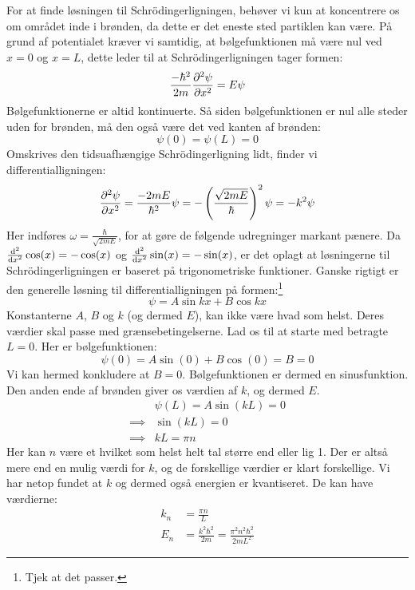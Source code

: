 \documentclass[../Kvantemekanik.tex]{subfiles}
\begin{document}
For at finde løsningen til Schrödingerligningen, behøver vi kun at koncentrere os om området inde i brønden, da dette er det eneste sted partiklen kan være. På grund af potentialet kræver vi samtidig, at bølgefunktionen må være nul ved $x=0$ og $x=L$, dette leder til at Schrödingerligningen tager formen:
\begin{equation}
    \frac{-\hbar^2}{2m}\pdif[2]{x}\psi=E\psi
    \label{kvant:eq:infb}
\end{equation}
Bølgefunktionerne er altid kontinuerte. Så siden bølgefunktionen er nul alle steder uden for brønden, må den også være det ved kanten af brønden:
$$
\psi(0)=\psi(L) = 0
$$
Omskrives den tidsuafhængige Schrödingerligning lidt, finder vi differentialligningen:
\begin{equation}
\pdif[2]{x}\psi = \frac{-2mE}{\hbar^2}\psi = -\left(\frac{\sqrt{2mE}}{\hbar}\right)^2\psi = -k^2\psi
\end{equation}
Her indføres $\omega = \frac{\hbar}{\sqrt{2mE}}$, for at gøre de følgende udregninger markant pænere.
Da $\dif[2]{x}{}\cos(x) = -\cos(x)$ og $\dif[2]{x}{}\sin(x) = -\sin(x)$, er det oplagt at løsningerne til Schrödingerligningen er baseret på trigonometriske funktioner. Ganske rigtigt er den generelle løsning til differentialligningen på formen:\footnote{Tjek at det passer.}
\begin{equation}
\psi = A\sin k x+B\cos k x
\end{equation}
Konstanterne $A$, $B$ og $k$ (og dermed $E$), kan ikke være hvad som helst. Deres værdier skal passe med grænsebetingelserne. Lad os til at starte med betragte $L=0$. Her er bølgefunktionen:
\begin{equation}
\psi(0) = A\sin(0)+B\cos(0) = B = 0
\end{equation}
Vi kan hermed konkludere at $B=0$. Bølgefunktionen er dermed en sinusfunktion.
Den anden ende af brønden giver os værdien af $k$, og dermed $E$. 
\begin{align*}
&\psi(L) = A\sin(k L) = 0\\
\implies &\sin(k L) = 0\\
\implies &k L = \pi n
\end{align*}
Her kan $n$ være et hvilket som helst helt tal større end eller lig 1. Der er altså mere end en mulig værdi for $k$, og de forskellige værdier er klart forskellige. Vi har netop fundet at $k$ og dermed også energien er kvantiseret. De kan have værdierne:
\begin{align}
k_n &= \frac{\pi n}{L}\\
E_n &= \frac{k^2\hbar^2}{2m} = \frac{\pi^2n^2\hbar^2}{2mL^2}
\end{align}
\end{document}
